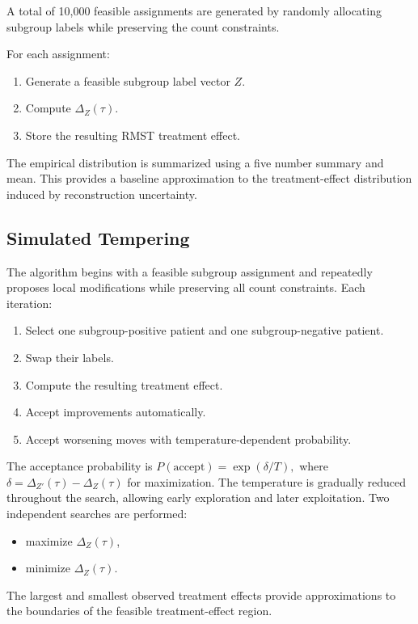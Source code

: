 \documentclass[11pt]{article}
\begin{document}
A total of 10,000 feasible assignments are generated by randomly allocating subgroup labels while preserving the count constraints.

For each assignment:

\begin{enumerate}
\item Generate a feasible subgroup label vector \(Z\).
\item Compute \(\Delta_Z(\tau)\).
\item Store the resulting RMST treatment effect.
\end{enumerate}

The empirical distribution is summarized using a five number summary and mean.
This provides a baseline approximation to the treatment-effect distribution induced by reconstruction uncertainty.

\subsection{Simulated Tempering}

The algorithm begins with a feasible subgroup assignment and repeatedly proposes local modifications while preserving all count constraints.
Each iteration:
\begin{enumerate}
\item Select one subgroup-positive patient and one subgroup-negative patient.
\item Swap their labels.
\item Compute the resulting treatment effect.
\item Accept improvements automatically.
\item Accept worsening moves with temperature-dependent probability.
\end{enumerate}

The acceptance probability is \(P(\text{accept})=\exp(\delta/T),\) where \(\delta=\Delta_{Z'}(\tau)-\Delta_Z(\tau)\) for maximization.
The temperature is gradually reduced throughout the search, allowing early exploration and later exploitation.
Two independent searches are performed:

\begin{itemize}
\item maximize \(\Delta_Z(\tau)\),
\item minimize \(\Delta_Z(\tau)\).
\end{itemize}

The largest and smallest observed treatment effects provide approximations to the boundaries of the feasible treatment-effect region.
\end{document}
